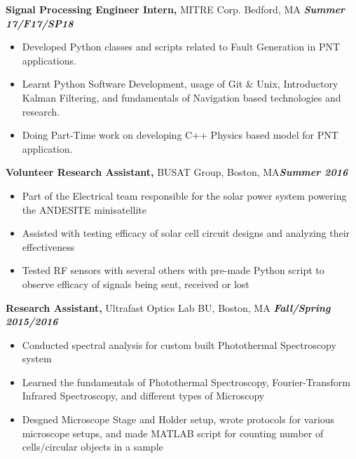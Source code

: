 \documentclass[margin]{res}
\begin{document}
\begin{resume}
 {\bf Signal Processing Engineer Intern,} MITRE Corp. Bedford, MA \hfill \textbf{\textit{Summer 17/F17/SP18}}
 \begin{itemize}  pt  %
 \item Developed Python classes and scripts related to Fault Generation in PNT applications.
 \item Learnt Python Software Development, usage of Git \& Unix, Introductory Kalman Filtering, and fundamentals of Navigation based technologies and research.
 \item Doing Part-Time work on developing C++ Physics based model for PNT application. 
 \end{itemize}

 
 
{\bf Volunteer Research Assistant,} BUSAT Group, Boston, MA\hfill  \textbf{\textit{Summer 2016}}
\begin{itemize} \itemsep -0.1pt %
\item Part of the Electrical team responsible for the solar power system powering the ANDESITE minisatellite
\item Assisted with testing efficacy of solar cell circuit designs and analyzing their effectiveness 
\item Tested RF sensors with several others with pre-made Python script to observe efficacy of signals being sent, received or lost
\end{itemize}


{\bf Research Assistant,} Ultrafast Optics Lab BU, Boston, MA \hfill \textbf{\textit{Fall/Spring 2015/2016}}
			\begin{itemize} \itemsep -2pt
			\item  Conducted spectral analysis for custom built Photothermal Spectroscopy system
			\item Learned the fundamentals of Photothermal Spectroscopy, Fourier-Transform Infrared Spectroscopy, and different types of Microscopy 
			\item Desgned Microscope Stage and Holder setup, wrote protocols for various microscope setups, and made MATLAB script for counting number of cells/circular objects in a sample
			\end{itemize}
			

\end{resume}
\end{document}

